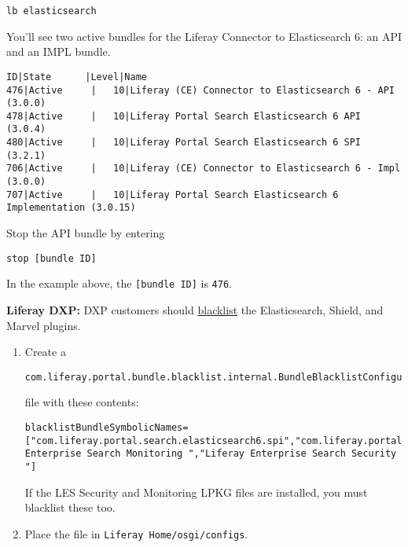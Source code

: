 \begin{verbatim}
lb elasticsearch
\end{verbatim}

You'll see two active bundles for the Liferay Connector to Elasticsearch
6: an API and an IMPL bundle.

\begin{verbatim}
ID|State      |Level|Name
476|Active     |   10|Liferay (CE) Connector to Elasticsearch 6 - API (3.0.0)
478|Active     |   10|Liferay Portal Search Elasticsearch 6 API (3.0.4)
480|Active     |   10|Liferay Portal Search Elasticsearch 6 SPI (3.2.1)
706|Active     |   10|Liferay (CE) Connector to Elasticsearch 6 - Impl (3.0.0)
707|Active     |   10|Liferay Portal Search Elasticsearch 6 Implementation (3.0.15)
\end{verbatim}

Stop the API bundle by entering

\begin{verbatim}
stop [bundle ID]
\end{verbatim}

In the example above, the \texttt{{[}bundle\ ID{]}} is \texttt{476}.

\textbf{Liferay DXP:} DXP customers should
\href{/docs/7-2/user/-/knowledge_base/u/blacklisting-osgi-bundles-and-components}{blacklist}
the Elasticsearch, Shield, and Marvel plugins.

\begin{enumerate}
\def\labelenumi{\arabic{enumi}.}
\item
  Create a

\begin{verbatim}
com.liferay.portal.bundle.blacklist.internal.BundleBlacklistConfiguration.config
\end{verbatim}

  file with these contents:

\begin{verbatim}
blacklistBundleSymbolicNames=["com.liferay.portal.search.elasticsearch6.spi","com.liferay.portal.search.elasticsearch6.api","com.liferay.portal.search.elasticsearch6.impl","Liferay Enterprise Search Monitoring ","Liferay Enterprise Search Security "]
\end{verbatim}

  If the LES Security and Monitoring LPKG files are installed, you must
  blacklist these too.
\item
  Place the file in \texttt{Liferay\ Home/osgi/configs}.
\end{enumerate}

